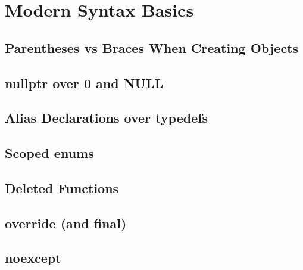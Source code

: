 \section{Modern Syntax Basics}\label{sec:modern-syntax}

\subsection{Parentheses vs Braces When Creating Objects}

\subsection{nullptr over 0 and NULL}

\subsection{Alias Declarations over typedefs}

\subsection{Scoped enums}

\subsection{Deleted Functions}

\subsection{override (and final)}

\subsection{noexcept}
